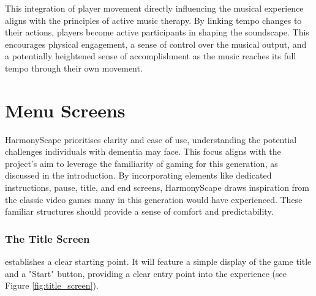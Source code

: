 \documentclass{l4proj}
\begin{document}
This integration of player movement directly influencing the musical experience aligns with the principles of active music therapy. By linking tempo changes to their actions, players become active participants in shaping the soundscape. This encourages physical engagement, a sense of control over the musical output, and a potentially heightened sense of accomplishment as the music reaches its full tempo through their own movement.

\section{Menu Screens}
HarmonyScape prioritises clarity and ease of use, understanding the potential challenges individuals with dementia may face. This focus aligns with the project's aim to leverage the familiarity of gaming for this generation, as discussed in the introduction. By incorporating elements like dedicated instructions, pause, title, and end screens, HarmonyScape draws inspiration from the classic video games many in this generation would have experienced. These familiar structures should provide a sense of comfort and predictability.

\subsubsection{The Title Screen} establishes a clear starting point. It will feature a simple display of the game title and a "Start" button, providing a clear entry point into the experience (see Figure \ref{fig:title_screen}).

\end{document}
